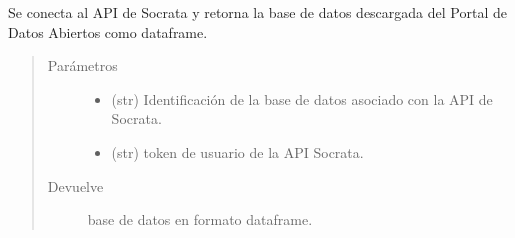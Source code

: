 \documentclass[letterpaper,10pt,openany,spanish]{sphinxmanual}
\begin{document}
\begin{fulllineitems}
\label{\detokenize{datos_gov:datos_gov.cargar_base}}
Se conecta al API de Socrata y retorna la base de datos descargada del Portal de Datos Abiertos
como dataframe.
\begin{quote}\begin{description}
\item[{Parámetros}] \leavevmode\begin{itemize}
\item {} 
 \textendash{} (str) Identificación de la base de datos asociado con la API de Socrata.

\item {} 
 \textendash{} (str)  \sphinxhyphen{} token de usuario de la API Socrata.

\end{itemize}

\item[{Devuelve}] \leavevmode
base de datos en formato dataframe.

\end{description}\end{quote}

\end{fulllineitems}

\end{document}
